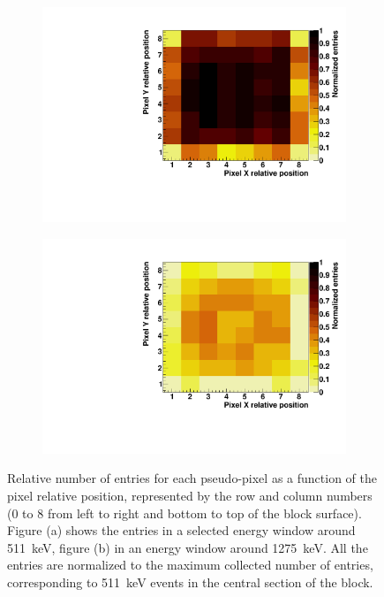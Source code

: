 \begin{figure}
\begin{subfigure}[t]{0.5\textwidth}
\centering
\includegraphics[width=1\textwidth]{03_GraphicFiles/chapter3_CLaRySproto/Absorber/images/eff_map_LE_norm.pdf}
\caption{}
\label{chap3::fig::abseffLE}
\end{subfigure}
\begin{subfigure}[t]{0.5\textwidth}
\centering
\includegraphics[width=1\textwidth]{03_GraphicFiles/chapter3_CLaRySproto/Absorber/images/eff_map_HE_norm.pdf}
\caption{}
\label{chap3::fig::abseffHE}
\end{subfigure}
\caption{Relative number of entries for each pseudo-pixel as a function of the pixel relative position, represented by the row and column numbers (0 to 8 from left to right and bottom to top of the block surface). Figure (a) shows the entries in a selected energy window around 511~keV, figure (b) in an energy window around 1275~keV. All the entries are normalized to the maximum collected number of entries, corresponding to 511~keV events in the central section of the block.}
\label{chap3::fig::absefficiency}
\end{figure}

